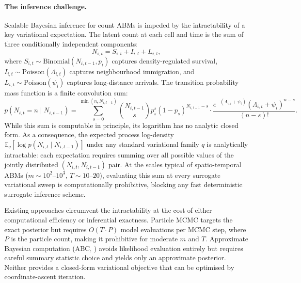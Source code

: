 \documentclass[review,12pt]{elsarticle}
\theoremstyle{definition}
\begin{document}
\paragraph{The inference challenge.}
Scalable Bayesian inference for count ABMs is impeded by the intractability of
a key variational expectation.  The latent count at each cell and time is the
sum of three conditionally independent components:
\[
  N_{i,t} = S_{i,t} + I_{i,t} + L_{i,t},
\]
where $S_{i,t}\sim\mathrm{Binomial}(N_{i,t-1},p_i)$ captures density-regulated
survival, $I_{i,t}\sim\mathrm{Poisson}(\Lambda_{i,t})$ captures neighbourhood
immigration, and $L_{i,t}\sim\mathrm{Poisson}(\psi_i)$ captures long-distance
arrivals.  The transition probability mass function is a finite convolution sum:
\begin{equation}\label{eq:conv-pmf}
p(N_{i,t}=n\mid N_{i,t-1})
=\sum_{s=0}^{\min(n,N_{i,t-1})}
\binom{N_{i,t-1}}{s}p_s^s(1-p_s)^{N_{i,t-1}-s}
\cdot\frac{e^{-(\Lambda_{i,t}+\psi_i)}(\Lambda_{i,t}+\psi_i)^{n-s}}{(n-s)!}.
\end{equation}
While this sum is computable in principle, its logarithm has no analytic
closed form.  As a consequence, the expected process log-density
$\mathbb{E}_q[\log p(N_{i,t}\mid N_{i,t-1})]$ under any standard
variational family $q$ is analytically intractable: each expectation
requires summing over all possible values of the jointly distributed
$(N_{i,t},N_{i,t-1})$ pair.  At the scales typical of spatio-temporal ABMs
($m\sim10^2$--$10^3$, $T\sim10$--$20$), evaluating this sum at every
surrogate variational sweep is computationally prohibitive, blocking any
fast deterministic surrogate inference scheme.

Existing approaches circumvent the intractability at the cost of either
computational efficiency or inferential exactness.  Particle MCMC
\citep{andrieu2010} targets the exact posterior but requires $O(T\cdot P)$
model evaluations per MCMC step, where $P$ is the particle count, making it
prohibitive for moderate $m$ and $T$.  Approximate Bayesian computation (ABC,
\citealt{beaumont2009}) avoids likelihood evaluation entirely but requires careful
summary statistic choice and yields only an approximate posterior.  Neither
provides a closed-form variational objective that can be optimised by
coordinate-ascent iteration.
\end{document}
